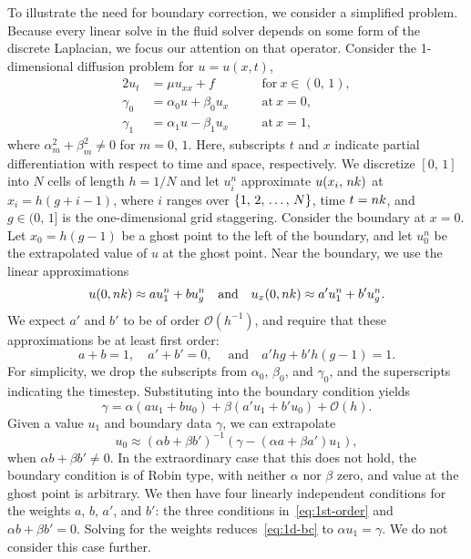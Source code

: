 To illustrate the need for boundary correction, we consider a simplified problem. Because
every linear solve in the fluid solver depends on some form of the discrete Laplacian, we
focus our attention on that operator. Consider the 1-dimensional diffusion problem for
$u = u(x, t)$,
\begin{alignat}{2}
    u_t      &= \mu u_{xx} + f           &&\quad \text{for} \ x\in(0,\,1), \label{eq:1d-diff} \\
    \gamma_0 &= \alpha_0 u + \beta_0 u_x &&\quad \text{at} \ x=0, \label{eq:1d-0bcs} \\
    \gamma_1 &= \alpha_1 u - \beta_1 u_x &&\quad \text{at} \ x=1, \label{eq:1d-1bcs}
\end{alignat}
where $\alpha_m^2 + \beta_m^2 \neq 0$ for $m = 0,\,1$. Here, subscripts $t$ and $x$
indicate partial differentiation with respect to time and space, respectively. We
discretize $[0,\,1]$ into $N$ cells of length $h=1/N$ and let $u_i^n$ approximate
$u(x_i,\,nk)$ at $x_i = h(g + i-1)$, where $i$ ranges over $\{1,\,2,\,\ldots,\,N\}$, time $t =
nk$, and $g\in(0,\,1]$ is the one-dimensional grid staggering. Consider the
boundary at $x=0$.  Let $x_0 = h(g-1)$ be a ghost point to the left of the boundary, and
let $u^n_0$ be the extrapolated value of $u$ at the ghost point. Near the boundary, we
use the linear approximations
\begin{equation}\label{eq:1d-approx}
    u(0, nk) \approx au^n_1 + bu^n_g \quad \text{and} \quad u_x(0, nk) \approx a'u^n_1 + b'u^n_g.
\end{equation}
We expect $a'$ and $b'$ to be of order $\mathcal{O}(h^{-1})$, and require that these
approximations be at least first order:
\begin{equation}\label{eq:1st-order}
    a+b=1, \quad a'+b'=0,\ \quad \text{and} \quad a'hg + b'h(g-1) = 1.
\end{equation}
For simplicity, we drop the subscripts from $\alpha_0$, $\beta_0$, and $\gamma_0$, and
the superscripts indicating the timestep. Substituting into the boundary condition yields
\begin{equation}\label{eq:1d-bc}
    \gamma = \alpha(au_1 + bu_0) + \beta(a'u_1 + b'u_0) + \mathcal{O}(h).
\end{equation}
Given a value $u_1$ and boundary data $\gamma$, we can extrapolate
\begin{equation}
    u_0 \approx (\alpha b + \beta b')^{-1}(\gamma-(\alpha a + \beta a')u_1),
\end{equation}
when $\alpha b + \beta b' \neq 0$. In the extraordinary case that this does not hold, the
boundary condition is of Robin type, with neither $\alpha$ nor $\beta$ zero, and value at
the ghost point is arbitrary.  We then have four linearly independent conditions for the
weights $a$, $b$, $a'$, and $b'$: the three conditions in~\eqref{eq:1st-order} and
$\alpha b + \beta b' = 0$. Solving for the weights reduces~\eqref{eq:1d-bc} to
$\alpha u_1 = \gamma$. We do not consider this case further.

